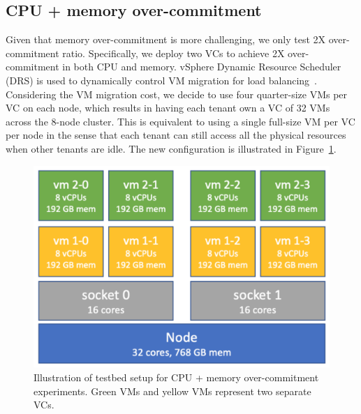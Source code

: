 \subsection{CPU + memory over-commitment}
Given that memory over-commitment is more challenging, 
we only test 2X over-commitment ratio. Specifically, 
we deploy two VCs to achieve 2X over-commitment in both CPU and memory. 
vSphere Dynamic Resource Scheduler (DRS) is used to dynamically control VM migration for load balancing~\cite{infrastructure2006resource}. Considering the VM migration cost, we decide to use four quarter-size VMs per VC on each node, which results in having each tenant own a VC of 32 VMs across the 8-node cluster. 
This is equivalent to using a single full-size VM per VC per node in the sense that each tenant can still access all the physical resources when other tenants are idle. 
The new configuration is illustrated in Figure~\ref{fig:exp_scenario_2}. 

\begin{figure}[!t]
   \begin{center}
       \includegraphics[width=\columnwidth]{Figures/exp_scenario_2.pdf}
   \end{center}
   \caption{Illustration of testbed setup for CPU + memory over-commitment experiments. Green VMs and yellow VMs represent two separate VCs.}
   \label{fig:exp_scenario_2}
 \end{figure}

